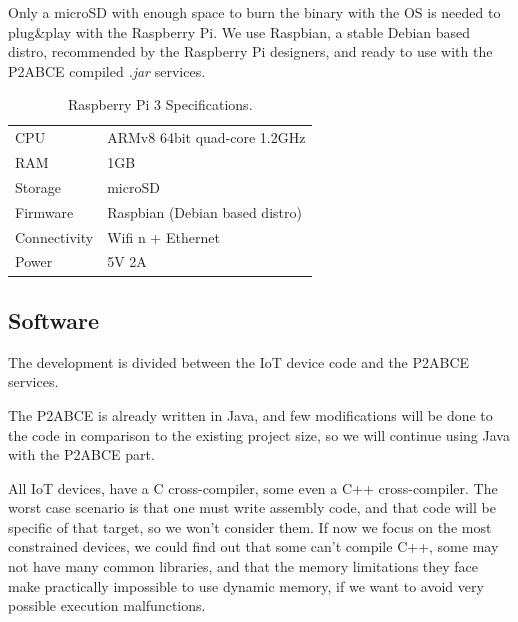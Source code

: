 Only a microSD with enough space to burn the binary with the OS is needed to plug\&play with the Raspberry Pi. We use Raspbian, a stable Debian based distro, recommended by the Raspberry Pi designers, and ready to use with the \ac{P2ABCE} compiled \textit{.jar} services.

\begin{table}[h]
	\myfloatalign
	\begin{tabularx}{0.75\textwidth}{ll} \toprule
		CPU & ARMv8 64bit quad-core 1.2GHz \\
		RAM & 1GB \\
		Storage & microSD \\
		Firmware & Raspbian (Debian based distro) \\
		Connectivity & Wifi n + Ethernet \\
		Power & 5V 2A \\
		\bottomrule
	\end{tabularx}
	\caption[Raspberry Pi 3 Specifications]{Raspberry Pi 3 Specifications.}
	\label{tab:RPi3Specs}
\end{table}






\subsection{Software}

The development is divided between the \ac{IoT} device code and the \ac{P2ABCE} services.

\hfil

The P2ABCE is already written in Java, and few modifications will be done to the code in comparison to the existing project size, so we will continue using Java with the P2ABCE part.

\hfil

All IoT devices, have a C cross-compiler, some even a C++ cross-compiler. The worst case scenario is that one must write assembly code, and that code will be specific of that target, so we won't consider them.
If now we focus on the most constrained devices, we could find out that some can't compile C++, some may not have many common libraries, and that the memory limitations they face make practically impossible to use dynamic memory, if we want to avoid very possible execution malfunctions.

